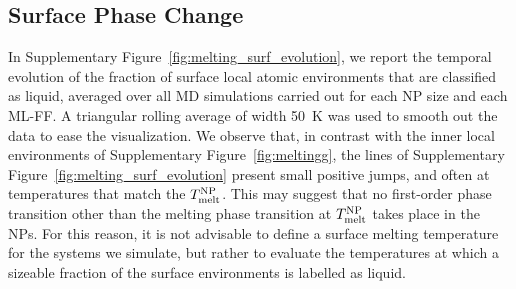 \documentclass[%
aip,
 amsmath,amssymb,
 reprint,
]{revtex4-1}
\newcommand*\subt[1]{_{\textnormal{#1}}}
\newcommand*\supt[1]{^{\textnormal{#1}}}
\begin{document}
\subsection*{Surface Phase Change}
In Supplementary Figure~\ref{fig:melting_surf_evolution}, we report the temporal evolution of the fraction of surface local atomic environments that are classified as liquid, averaged over all MD simulations carried out for each NP size and each ML-FF.
%
A triangular rolling average of width 50~K was used to smooth out the data to ease the visualization.
%
We observe that, in contrast with the inner local environments of Supplementary Figure~\ref{fig:meltingg}, the lines of Supplementary Figure~\ref{fig:melting_surf_evolution} present small positive jumps, and often at temperatures that match the $T\subt{melt}\supt{NP}$.
%
This may suggest that no first-order phase transition other than the melting phase transition at $T\subt{melt}\supt{NP}$ takes place in the NPs.
%
For this reason, it is not advisable to define a surface melting temperature for the systems we simulate, but rather to evaluate the temperatures at which a sizeable fraction of the surface environments is labelled as liquid.
\end{document}
